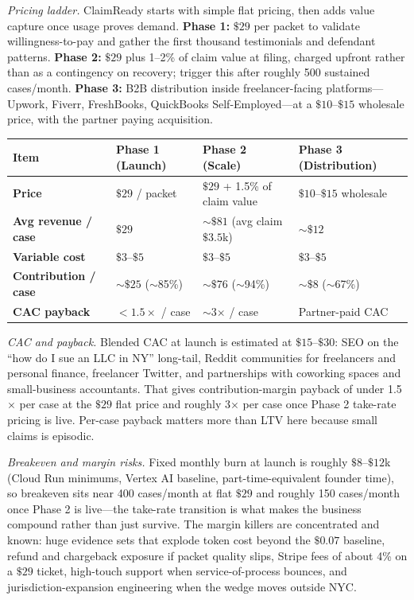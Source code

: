 \documentclass[11pt]{article}
\begin{document}
{\itshape Pricing ladder.} ClaimReady starts with simple flat pricing, then adds value capture once usage proves demand. \textbf{Phase 1:} \(\$29\) per packet to validate willingness-to-pay and gather the first thousand testimonials and defendant patterns. \textbf{Phase 2:} \(\$29\) plus 1--2\% of claim value at filing, charged upfront rather than as a contingency on recovery; trigger this after roughly 500 sustained cases/month. \textbf{Phase 3:} B2B distribution inside freelancer-facing platforms---Upwork, Fiverr, FreshBooks, QuickBooks Self-Employed---at a \(\$10\)--\(\$15\) wholesale price, with the partner paying acquisition.

\vspace{-1pt}
\begin{center}
\begin{tabular}{>{\raggedright\arraybackslash\bfseries}p{1.42in}>{\raggedright\arraybackslash}p{1.55in}>{\raggedright\arraybackslash}p{1.85in}>{\raggedright\arraybackslash}p{1.85in}}
\toprule
Item & Phase 1 (Launch) & Phase 2 (Scale) & Phase 3 (Distribution) \\
\midrule
Price & \(\$29\) / packet & \(\$29\) + 1.5\% of claim value & \(\$10\)--\(\$15\) wholesale \\
Avg revenue / case & \(\$29\) & \(\sim\$81\) (avg claim \(\$3.5\)k) & \(\sim\$12\) \\
Variable cost & \(\$3\)--\(\$5\) & \(\$3\)--\(\$5\) & \(\$3\)--\(\$5\) \\
Contribution / case & \(\sim\$25\) (\(\sim\)85\%) & \(\sim\$76\) (\(\sim\)94\%) & \(\sim\$8\) (\(\sim\)67\%) \\
CAC payback & \(<1.5\times\) / case & \(\sim\)3\(\times\) / case & Partner-paid CAC \\
\bottomrule
\end{tabular}
\end{center}
\vspace{-1pt}

{\itshape CAC and payback.} Blended CAC at launch is estimated at \(\$15\)--\(\$30\): SEO on the ``how do I sue an LLC in NY'' long-tail, Reddit communities for freelancers and personal finance, freelancer Twitter, and partnerships with coworking spaces and small-business accountants. That gives contribution-margin payback of under 1.5\(\times\) per case at the \(\$29\) flat price and roughly 3\(\times\) per case once Phase 2 take-rate pricing is live. Per-case payback matters more than LTV here because small claims is episodic.

{\itshape Breakeven and margin risks.} Fixed monthly burn at launch is roughly \(\$8\)--\(\$12\)k (Cloud Run minimums, Vertex AI baseline, part-time-equivalent founder time), so breakeven sits near 400 cases/month at flat \(\$29\) and roughly 150 cases/month once Phase 2 is live---the take-rate transition is what makes the business compound rather than just survive. The margin killers are concentrated and known: huge evidence sets that explode token cost beyond the \(\$0.07\) baseline, refund and chargeback exposure if packet quality slips, Stripe fees of about 4\% on a \(\$29\) ticket, high-touch support when service-of-process bounces, and jurisdiction-expansion engineering when the wedge moves outside NYC.
\end{document}
